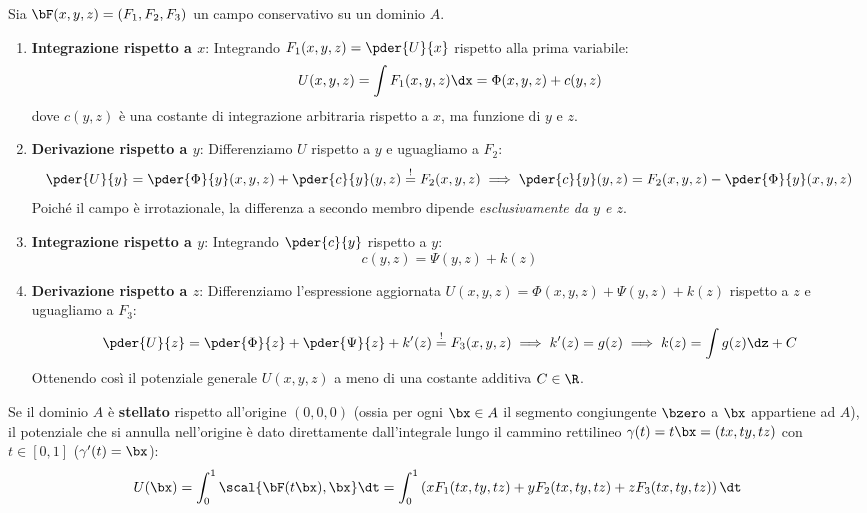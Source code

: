 \begin{metodo}
Sia $\bF(x,y,z) = (F_1, F_2, F_3)$ un campo conservativo su un dominio $A$.
\begin{enumerate}
    \item \textbf{Integrazione rispetto a $x$}: Integrando $F_1(x,y,z) = \pder{U}{x}$ rispetto alla prima variabile:
    \[
    U(x,y,z) = \int F_1(x,y,z) \dx = \Phi(x,y,z) + c(y,z)
    \]
    dove $c(y,z)$ è una costante di integrazione arbitraria rispetto a $x$, ma funzione di $y$ e $z$.
    \item \textbf{Derivazione rispetto a $y$}: Differenziamo $U$ rispetto a $y$ e uguagliamo a $F_2$:
    \[
    \pder{U}{y} = \pder{\Phi}{y}(x,y,z) + \pder{c}{y}(y,z) \stackrel{!}{=} F_2(x,y,z) \implies \pder{c}{y}(y,z) = F_2(x,y,z) - \pder{\Phi}{y}(x,y,z)
    \]
    Poiché il campo è irrotazionale, la differenza a secondo membro dipende \emph{esclusivamente da $y$ e $z$}.
    \item \textbf{Integrazione rispetto a $y$}: Integrando $\pder{c}{y}$ rispetto a $y$:
    \[
    c(y,z) = \Psi(y,z) + k(z)
    \]
    \item \textbf{Derivazione rispetto a $z$}: Differenziamo l'espressione aggiornata $U(x,y,z) = \Phi(x,y,z) + \Psi(y,z) + k(z)$ rispetto a $z$ e uguagliamo a $F_3$:
    \[
    \pder{U}{z} = \pder{\Phi}{z} + \pder{\Psi}{z} + k'(z) \stackrel{!}{=} F_3(x,y,z) \implies k'(z) = g(z) \implies k(z) = \int g(z)\dz + C
    \]
    Ottenendo così il potenziale generale $U(x,y,z)$ a meno di una costante additiva $C \in \R$.
\end{enumerate}
\end{metodo}

\begin{metodo}
Se il dominio $A$ è \textbf{stellato} rispetto all'origine $(0,0,0)$ (ossia per ogni $\bx \in A$ il segmento congiungente $\bzero$ a $\bx$ appartiene ad $A$), il potenziale che si annulla nell'origine è dato direttamente dall'integrale lungo il cammino rettilineo $\gamma(t) = t \bx = (tx, ty, tz)$ con $t \in [0,1]$ ($\gamma'(t) = \bx$):
\[
U(\bx) = \int_{0}^{1} \scal{\bF(t\bx), \bx} \dt = \int_{0}^{1} \left( x F_1(tx,ty,tz) + y F_2(tx,ty,tz) + z F_3(tx,ty,tz) \right) \dt
\]
\end{metodo}

